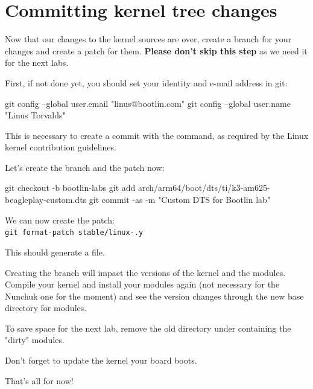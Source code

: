 \section{Committing kernel tree changes}

Now that our changes to the kernel sources are over,
create a branch for your changes and create a patch for them.
{\bf Please don't skip this step} as we need it for the next labs.

First, if not done yet, you should set your identity
and e-mail address in git:

\begin{bashinput}
git config --global user.email "linus@bootlin.com"
git config --global user.name "Linus Torvalds"
\end{bashinput}

This is necessary to create a commit with the 
command, as required by the Linux kernel contribution guidelines.

Let's create the branch and the patch now:

\begin{bashinput}
git checkout -b bootlin-labs
git add arch/arm64/boot/dts/ti/k3-am625-beagleplay-custom.dts
git commit -as -m "Custom DTS for Bootlin lab"
\end{bashinput}

We can now create the patch:\\
\texttt{git format-patch stable/linux-\workingkernel.y}

This should generate a 
file.

Creating the branch will impact the versions of the kernel and the modules.
Compile your kernel and install your modules again (not necessary for the
Nunchuk one for the moment) and see the version changes through the
new base directory for modules.

To save space for the next lab, remove the old directory under
 containing the "dirty" modules.

Don't forget to update the kernel your board boots.

That's all for now!
